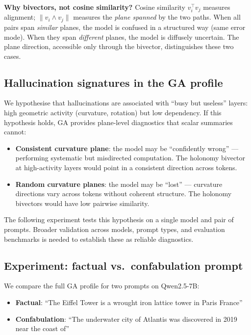 \documentclass[11pt, twoside, openright]{memoir}
\newcommand{\op}{\wedge}          %
\begin{document}
\begin{gabox}
\textbf{Why bivectors, not cosine similarity?}  Cosine similarity
$v_i^\top v_j$ measures alignment; $\|v_i \op v_j\|$ measures the
\emph{plane spanned} by the two paths.  When all pairs span
\emph{similar} planes, the model is confused in a structured way
(same error mode).  When they span \emph{different} planes, the model
is diffusely uncertain.  The plane direction, accessible only through
the bivector, distinguishes these two cases.
\end{gabox}

\subsection{Hallucination signatures in the GA profile}

We hypothesise that hallucinations are associated with ``busy but
useless'' layers: high geometric activity (curvature, rotation) but low
dependency.  If this hypothesis holds, GA provides plane-level
diagnostics that scalar summaries cannot:

\begin{itemize}[nosep]
\item \textbf{Consistent curvature plane}: the model may be
  ``confidently wrong'' --- performing systematic but misdirected
  computation.  The holonomy bivector at high-activity layers would
  point in a consistent direction across tokens.
\item \textbf{Random curvature planes}: the model may be ``lost'' ---
  curvature directions vary across tokens without coherent structure.
  The holonomy bivectors would have low pairwise similarity.
\end{itemize}

The following experiment tests this hypothesis on a single model
and pair of prompts.  Broader validation across models, prompt types,
and evaluation benchmarks is needed to establish these as reliable
diagnostics.

\subsection{Experiment: factual vs.\ confabulation prompt}

We compare the full GA profile for two prompts on Qwen2.5-7B:
\begin{itemize}[nosep]
\item \textbf{Factual}: ``The Eiffel Tower is a wrought iron lattice
  tower in Paris France''
\item \textbf{Confabulation}: ``The underwater city of Atlantis was
  discovered in 2019 near the coast of''
\end{itemize}
\end{document}
